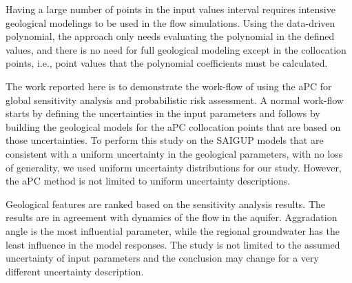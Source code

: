 {Having a large number of points in the input values interval requires
intensive geological modelings to be used in the flow simulations. Using the
data-driven polynomial, the approach only needs evaluating the polynomial in the
defined values, and there is no need for full geological modeling except in
the collocation points, i.e., point values that the polynomial coefficients must
be calculated. 

The work reported here is to demonstrate the work-flow of using the aPC for
global sensitivity analysis and probabilistic risk assessment. A normal
work-flow starts by defining the uncertainties in the input parameters and
follows by building the geological models for the aPC collocation points that are based on those uncertainties.
To perform this study on the SAIGUP models that are consistent
with a uniform uncertainty in the geological parameters, with no loss of
generality, we used uniform uncertainty distributions for our study. However,
the aPC method is not limited to uniform uncertainty descriptions.

Geological features are ranked based on the sensitivity analysis results. The
results are in agreement with dynamics of the flow in the aquifer. Aggradation
angle is the most influential parameter, while the regional groundwater has the
least influence in the model responses. The study is not limited to the assumed
uncertainty of input parameters and the conclusion may change for a very
different uncertainty description. 

}
